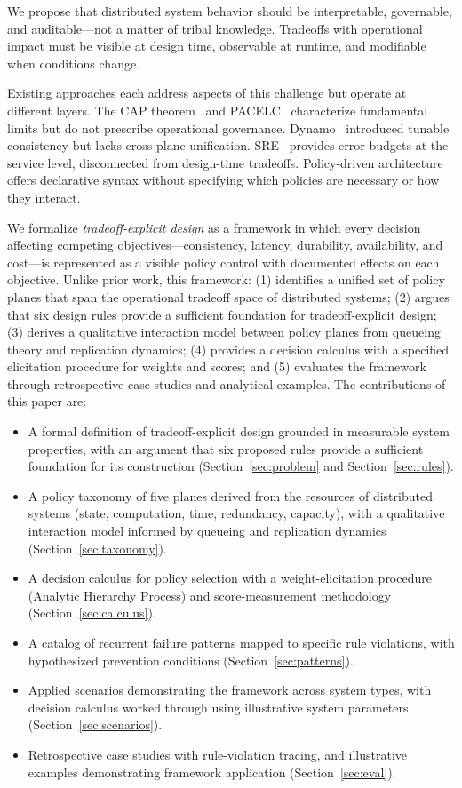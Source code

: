 \documentclass[conference]{IEEEtran}
\begin{document}
We propose that distributed system behavior should be interpretable, governable, and auditable---not a matter of tribal knowledge. Tradeoffs with operational impact must be visible at design time, observable at runtime, and modifiable when conditions change.

Existing approaches each address aspects of this challenge but operate at different layers. The CAP theorem~\cite{brewer2000cap,gilbert2002brewer} and PACELC~\cite{pacelc} characterize fundamental limits but do not prescribe operational governance. Dynamo~\cite{dynamo} introduced tunable consistency but lacks cross-plane unification. SRE~\cite{sre} provides error budgets at the service level, disconnected from design-time tradeoffs. Policy-driven architecture~\cite{policyarch} offers declarative syntax without specifying which policies are necessary or how they interact.

We formalize \textit{tradeoff-explicit design} as a framework in which every decision affecting competing objectives---consistency, latency, durability, availability, and cost---is represented as a visible policy control with documented effects on each objective. Unlike prior work, this framework: (1) identifies a unified set of policy planes that span the operational tradeoff space of distributed systems; (2) argues that six design rules provide a sufficient foundation for tradeoff-explicit design; (3) derives a qualitative interaction model between policy planes from queueing theory and replication dynamics; (4) provides a decision calculus with a specified elicitation procedure for weights and scores; and (5) evaluates the framework through retrospective case studies and analytical examples. The contributions of this paper are:

\begin{itemize}
    \item A formal definition of tradeoff-explicit design grounded in measurable system properties, with an argument that six proposed rules provide a sufficient foundation for its construction (Section~\ref{sec:problem} and Section~\ref{sec:rules}).
    \item A policy taxonomy of five planes derived from the resources of distributed systems (state, computation, time, redundancy, capacity), with a qualitative interaction model informed by queueing and replication dynamics (Section~\ref{sec:taxonomy}).
    \item A decision calculus for policy selection with a weight-elicitation procedure (Analytic Hierarchy Process) and score-measurement methodology (Section~\ref{sec:calculus}).
    \item A catalog of recurrent failure patterns mapped to specific rule violations, with hypothesized prevention conditions (Section~\ref{sec:patterns}).
    \item Applied scenarios demonstrating the framework across system types, with decision calculus worked through using illustrative system parameters (Section~\ref{sec:scenarios}).
    \item Retrospective case studies with rule-violation tracing, and illustrative examples demonstrating framework application (Section~\ref{sec:eval}).
\end{itemize}
\end{document}
